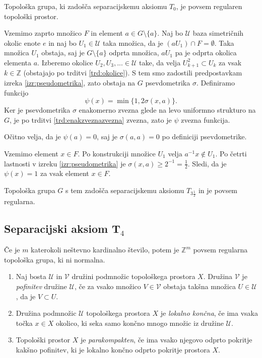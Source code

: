 \documentclass[mat1]{fmfdelo}
\newcommand{\Z}{\mathbb Z}
\newcommand{\Ucurl}{\mathcal{U}}
\begin{document}
\begin{izrek}\label{izr:t3pol}
	Topološka grupa, ki zadošča separacijskemu aksiomu $T_0$, je povsem regularen topološki prostor.
\end{izrek}

\begin{dokaz}
Vzemimo zaprto množico $F$ in element $a \in G\setminus\lbrace a \rbrace$.
Naj bo $\Ucurl$ baza simetričnih okolic enote $e$ in naj bo $U_1 \in \Ucurl$ taka množica, da je $(aU_1)\cap F = \emptyset$. Taka množica $U_1$ obstaja, saj je $G\setminus\lbrace a \rbrace$ odprta množica, $aU_1$ pa je odprta okolica elementa $a$. Izberemo okolice $U_2, U_3,... \in \Ucurl$ take, da velja $U_{k+1}^2 \subset U_k$ za vsak $k \in \Z$ (obstajajo po trditvi \ref{trd:okolice}). S tem smo zadostili predpostavkam izreka \ref{izr:pseudometrika}, zato obstaja na $G$ psevdometrika $\sigma$. Definiramo funkcijo \[ \psi(x) = \min\lbrace 1, 2\sigma(x, a)\rbrace. \] Ker je psevdometrika $\sigma$ enakomerno zvezna glede na levo uniformno strukturo na $G$, je po trditvi \ref{trd:enakzveznazvezna} zvezna, zato je $\psi$ zvezna funkcija.

Očitno velja, da je $\psi(a) = 0$, saj je $\sigma(a, a) = 0$ po definiciji psevdometrike.

Vzemimo element $x \in F$. Po konstrukciji množice $U_1$ velja $a^{-1}x \notin U_1$. Po četrti lastnosti v izreku \ref{izr:pseudometrika} je $\sigma(x, a) \geq 2^{-1} = \frac{1}{2}$. Sledi, da je $\psi(x) = 1$ za vsak element $x \in F$.

Topološka grupa $G$ s tem zadošča separacijskemu aksiomu $T_{3\frac{1}{2}}$ in je povsem regularna.
\end{dokaz}

\subsection{Separacijski aksiom T$_4$}
\begin{izrek}\label{izr:t4protiprimer}
	Če je $m$ katerokoli neštevno kardinalno število, potem je $\Z^{m}$ povsem regularna topološka grupa, ki ni normalna.
\end{izrek}

\begin{definicija}\label{def:parakompakt}
	\begin{enumerate}
		\item Naj bosta $\mathcal{U}$ in $\mathcal{V}$ družini podmnožic topološkega prostora $X$. Družina $\mathcal{V}$ je \emph{pofinitev} družine $\mathcal{U}$, če za vsako množico $V \in \mathcal{V}$ obstaja takšna množica $U \in \mathcal{U}$, da je $V \subset U$.
		\item Družina podmnožic $\mathcal{U}$ topološkega prostora $X$ je \emph{lokalno končna}, če ima vsaka točka $x \in X$ okolico, ki seka samo končno mnogo množic iz družine $\mathcal{U}$.
		\item Topološki prostor $X$ je \emph{parakompakten}, če ima vsako njegovo odprto pokritje kakšno pofinitev, ki je lokalno končno odprto pokritje prostora $X$.
	\end{enumerate}
\end{definicija}
\end{document}
